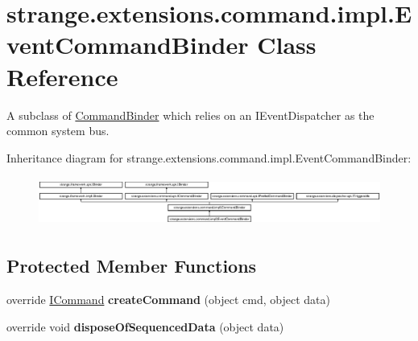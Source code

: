 \hypertarget{classstrange_1_1extensions_1_1command_1_1impl_1_1_event_command_binder}{\section{strange.\-extensions.\-command.\-impl.\-Event\-Command\-Binder Class Reference}
\label{classstrange_1_1extensions_1_1command_1_1impl_1_1_event_command_binder}
}


A subclass of \hyperlink{classstrange_1_1extensions_1_1command_1_1impl_1_1_command_binder}{Command\-Binder} which relies on an I\-Event\-Dispatcher as the common system bus.  


Inheritance diagram for strange.\-extensions.\-command.\-impl.\-Event\-Command\-Binder\-:\begin{figure}[H]
\begin{center}
\leavevmode
\includegraphics[height=1.642229cm]{classstrange_1_1extensions_1_1command_1_1impl_1_1_event_command_binder}
\end{center}
\end{figure}
\subsection*{Protected Member Functions}
\begin{DoxyCompactItemize}
\item 
\hypertarget{classstrange_1_1extensions_1_1command_1_1impl_1_1_event_command_binder_a94afde29529aaad8582557d7760d74a0}{override \hyperlink{interfacestrange_1_1extensions_1_1command_1_1api_1_1_i_command}{I\-Command} {\bfseries create\-Command} (object cmd, object data)}\label{classstrange_1_1extensions_1_1command_1_1impl_1_1_event_command_binder_a94afde29529aaad8582557d7760d74a0}

\item 
\hypertarget{classstrange_1_1extensions_1_1command_1_1impl_1_1_event_command_binder_af55231a3911742bd6dd6dee6ea4c47e9}{override void {\bfseries dispose\-Of\-Sequenced\-Data} (object data)}\label{classstrange_1_1extensions_1_1command_1_1impl_1_1_event_command_binder_af55231a3911742bd6dd6dee6ea4c47e9}

\end{DoxyCompactItemize}
